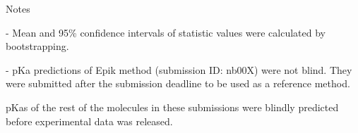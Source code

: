 \documentclass{article}
\begin{document}
Notes

- Mean and 95\% confidence intervals of statistic values were calculated by bootstrapping.

- pKa predictions of Epik method (submission ID: nb00X) were not blind. They were submitted after the submission deadline to be used as a reference method.

pKas of the rest of the molecules in these submissions were blindly predicted before experimental data was released.
\end{document}
